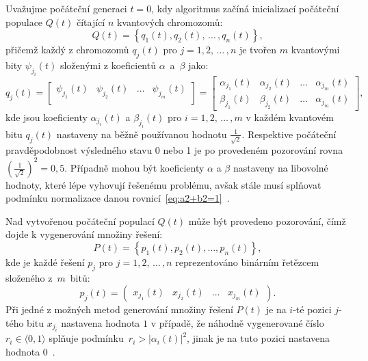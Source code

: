 Uvažujme počáteční generaci $t=0$, kdy algoritmus začíná inicializací počáteční populace $Q\left(t\right)$ čítající $n$ kvantových chromozomů:
\begin{equation}\label{eq:q(t)}
    Q\left(t\right) = \left\{ q_1\left(t\right), q_2\left(t\right),\,\dots\,, q_n\left(t\right) \right\},
\end{equation}
přičemž každý z chromozomů $q_j\left(t\right)$ pro $j = 1,2,\,\dots\,,n$ je tvořen $m$ kvantovými bity $\psi_{j_i}\left(t\right)$ složenými z koeficientů $\alpha$~a~$\beta$ jako:
\begin{equation*}
    q_j\left(t\right) =
    \begin{bmatrix}
        \psi_{j_1}\left(t\right) & \psi_{j_2}\left(t\right) & \dots & \psi_{j_m}\left(t\right) \\
    \end{bmatrix}
    =
    \begin{bmatrix}
        \alpha_{j_1}\left(t\right) & \alpha_{j_2}\left(t\right) & \dots & \alpha_{j_m}\left(t\right) \\
        \beta_{j_1}\left(t\right)  & \beta_{j_2}\left(t\right)  & \dots & \alpha_{j_m}\left(t\right)
    \end{bmatrix},
\end{equation*}
kde jsou koeficienty $\alpha_{j_i}\left(t\right)$ a $\beta_{j_i}\left(t\right)$ pro $i = 1,2,\,\dots\,,m$ v každém kvantovém bitu $q_j\left(t\right)$ nastaveny na běžně používanou hodnotu $\frac{1}{\sqrt{2}}$. 
Respektive počáteční pravděpodobnost výsledného stavu 0 nebo 1 je po provedeném pozorování rovna $\left(\frac{1}{\sqrt{2}}\right)^2 = 0,5$. 
Případně mohou být koeficienty $\alpha$ a $\beta$ nastaveny na libovolné hodnoty, které lépe vyhovují řešenému problému, avšak stále musí splňovat podmínku normalizace danou rovnicí~\ref{eq:a2+b2=1}~\cite{NaturalComputing,qiga}. 

Nad vytvořenou počáteční populací $Q\left(t\right)$ může být provedeno pozorování, čímž dojde k vygenerování množiny řešení:
\begin{equation}\label{eq:p(t)}
    P\left(t\right) = \left\{ p_1\left(t\right), p_2\left(t\right), \dots, p_n\left(t\right) \right\},
\end{equation}
kde je každé řešení $p_j$ pro $j = 1, 2,\,\dots\,, n$ reprezentováno binárním řetězcem složeného z~$m$~bitů:
\begin{equation*}
    p_j\left(t\right) = 
    \begin{pmatrix}
        x_{j_1}\left(t\right) & x_{j_2}\left(t\right) & \dots & x_{j_m}\left(t\right)
    \end{pmatrix}.
\end{equation*}
Při jedné z možných metod generování množiny řešení $P\left(t\right)$ je na $i$-té pozici $j$-tého bitu $x_{j_{i}}$ nastavena hodnota $1$ v případě, že náhodně vygenerované číslo $r_i \in \langle 0, 1\rangle$ splňuje podmínku~$r_i > \left| \alpha_i\left(t\right) \right|^2$, jinak je na tuto pozici nastavena hodnota $0$~\cite{NaturalComputing,qiga}.

